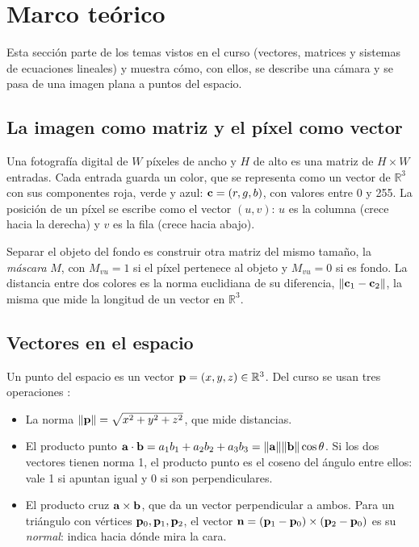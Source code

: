\section{Marco teórico}

Esta sección parte de los temas vistos en el curso (vectores, matrices y
sistemas de ecuaciones lineales) y muestra cómo, con ellos, se describe una
cámara y se pasa de una imagen plana a puntos del espacio.

\subsection{La imagen como matriz y el píxel como vector}

Una fotografía digital de $W$ píxeles de ancho y $H$ de alto es una matriz de
$H\times W$ entradas. Cada entrada guarda un color, que se representa como un
vector de $\mathbb{R}^3$ con sus componentes roja, verde y azul:
$\mathbf{c}=(r,g,b)$, con valores entre 0 y 255. La posición de un píxel se
escribe como el vector $(u,v)$: $u$ es la columna (crece hacia la derecha) y
$v$ es la fila (crece hacia abajo).

Separar el objeto del fondo es construir otra matriz del mismo tamaño, la
\emph{máscara} $M$, con $M_{vu}=1$ si el píxel pertenece al objeto y
$M_{vu}=0$ si es fondo. La distancia entre dos colores es la norma euclidiana
de su diferencia, $\lVert\mathbf{c}_1-\mathbf{c}_2\rVert$, la misma que mide la
longitud de un vector en $\mathbb{R}^3$.

\subsection{Vectores en el espacio}

Un punto del espacio es un vector $\mathbf{p}=(x,y,z)\in\mathbb{R}^3$. Del curso
se usan tres operaciones \citep{strang2016,lay2016}:
\begin{itemize}
  \item La norma $\lVert\mathbf{p}\rVert=\sqrt{x^2+y^2+z^2}$, que mide distancias.
  \item El producto punto $\mathbf{a}\cdot\mathbf{b}=a_1b_1+a_2b_2+a_3b_3
        =\lVert\mathbf{a}\rVert\lVert\mathbf{b}\rVert\cos\theta$. Si los dos
        vectores tienen norma 1, el producto punto es el coseno del ángulo
        entre ellos: vale 1 si apuntan igual y 0 si son perpendiculares.
  \item El producto cruz $\mathbf{a}\times\mathbf{b}$, que da un vector
        perpendicular a ambos. Para un triángulo con vértices
        $\mathbf{p}_0,\mathbf{p}_1,\mathbf{p}_2$, el vector
        $\mathbf{n}=(\mathbf{p}_1-\mathbf{p}_0)\times(\mathbf{p}_2-\mathbf{p}_0)$ es su
        \emph{normal}: indica hacia dónde mira la cara.
\end{itemize}

